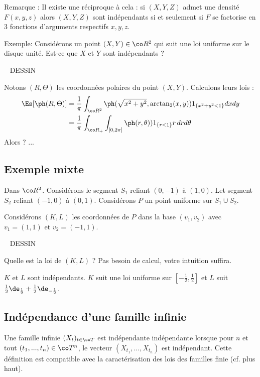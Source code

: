 \documentclass{article}
\def\dessin{\ \linebreak \vspace{0.5cm}  \linebreak  DESSIN  \vspace{1cm} \ \linebreak   }
\begin{document}
Remarque : Il existe une réciproque à cela : si $(X,Y,Z)$ admet une densité $F(x,y,z)$ alors $(X,Y,Z)$ sont indépendants si et seulement si $F$ se factorise en 3 fonctions d'arguments respectifs $x,y,z$. 


Exemple: Considérons un point $(X,Y)\in \co R^2$ qui suit une loi uniforme sur le disque unité.  Est-ce que $X$ et $Y$ sont indépendants ? 

\dessin


Notons $(R,\Theta)$ les coordonnées polaires du point $(X,Y)$. Calculons leurs lois : 
\begin{alignat*}{1}
\Es[\ph(R,\Theta)]&= \frac 1 \pi \int_{\co R^2} \ph(\sqrt{x^2+y^2} , \arctan_2 (x,y ) )  1_{\{x^2+y^2<1 \}}  dx dy  \\
&=   \frac 1 \pi\int_{\co R_+}    \int_{[0,2\pi]}    \ph(r , \theta ) )    1_{\{r<1 \}}   r\,       dr   d\theta  \\
\end{alignat*}
Alors ? ... 


\subsection{Exemple mixte}

Dans $\co R^2$. Considérons le segment $S_1$ reliant $(0,-1)$ à $(1,0)$. Let segment $S_2$ reliant $(-1,0)$ à $(0,1)$. Considérons $P$ un point uniforme sur $S_1 \cup S_2$. 


Considérons $(K,L)$ les coordonnées de $P$ dans la base $(v_1,v_2)$ avec $v_1=(1,1)$ et $v_2=(-1,1)$. 


\dessin  


Quelle est la loi de $(K,L)$ ?  Pas besoin de calcul, votre intuition suffira. 

\begin{tiny}
$K$ et $L$ sont indépendants.  $K$ suit une loi uniforme sur $[-\frac 1 2, \frac 12]$ et $L$ suit $\frac 1 2 \de_{\frac 12 } + \frac 1 2  \de_{-\frac 1 2}$.
\end{tiny}






\subsection{Indépendance d'une famille infinie}

Une famille infinie $(X_t)_{t\in \co T}$ est indépendante indépendante   lorsque pour $n$ et tout  $(t_1,...,t_n) \in \co T^n$, le vecteur  $(X_{t_1},...,X_{t_n})$ est indépendant. 
Cette définition est compatible avec la caractérisation des lois des familles finie (cf. plus haut). 
\end{document}
